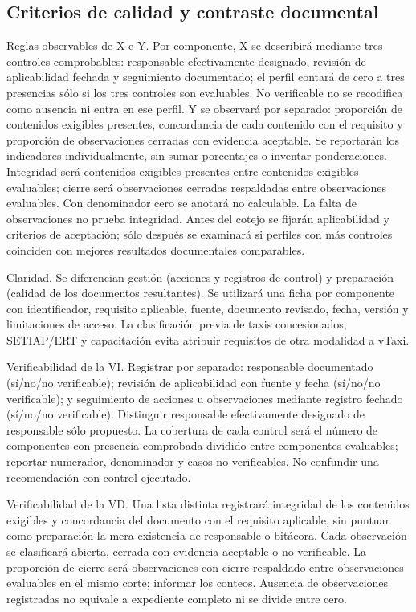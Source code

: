 {\subsection{Criterios de calidad y contraste documental}
Reglas observables de X e Y. Por componente, X se describirá mediante tres controles comprobables: responsable efectivamente designado, revisión de aplicabilidad fechada y seguimiento documentado; el perfil contará de cero a tres presencias sólo si los tres controles son evaluables. No verificable no se recodifica como ausencia ni entra en ese perfil. Y se observará por separado: proporción de contenidos exigibles presentes, concordancia de cada contenido con el requisito y proporción de observaciones cerradas con evidencia aceptable. Se reportarán los indicadores individualmente, sin sumar porcentajes o inventar ponderaciones. Integridad será contenidos exigibles presentes entre contenidos exigibles evaluables; cierre será observaciones cerradas respaldadas entre observaciones evaluables. Con denominador cero se anotará no calculable. La falta de observaciones no prueba integridad. Antes del cotejo se fijarán aplicabilidad y criterios de aceptación; sólo después se examinará si perfiles con más controles coinciden con mejores resultados documentales comparables.


Claridad. Se diferencian gestión (acciones y registros de control) y preparación (calidad de los documentos resultantes). Se utilizará una ficha por componente con identificador, requisito aplicable, fuente, documento revisado, fecha, versión y limitaciones de acceso. La clasificación previa de taxis concesionados, SETIAP/ERT y capacitación evita atribuir requisitos de otra modalidad a vTaxi.


Verificabilidad de la VI. Registrar por separado: responsable documentado (sí/no/no verificable); revisión de aplicabilidad con fuente y fecha (sí/no/no verificable); y seguimiento de acciones u observaciones mediante registro fechado (sí/no/no verificable). Distinguir responsable efectivamente designado de responsable sólo propuesto. La cobertura de cada control será el número de componentes con presencia comprobada dividido entre componentes evaluables; reportar numerador, denominador y casos no verificables. No confundir una recomendación con control ejecutado.


Verificabilidad de la VD. Una lista distinta registrará integridad de los contenidos exigibles y concordancia del documento con el requisito aplicable, sin puntuar como preparación la mera existencia de responsable o bitácora. Cada observación se clasificará abierta, cerrada con evidencia aceptable o no verificable. La proporción de cierre será observaciones con cierre respaldado entre observaciones evaluables en el mismo corte; informar los conteos. Ausencia de observaciones registradas no equivale a expediente completo ni se divide entre cero.


}
